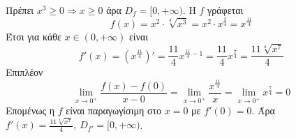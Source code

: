\begin{alist}
\item Πρέπει $ x^3\geq 0\Rightarrow x\geq 0 $ άρα $ D_f=[0,+\infty) $. Η $ f $ γράφεται
\[ f(x)=x^2\cdot\sqrt[4]{x^3}=x^2\cdot x^{\frac{3}{4}}=x^{\frac{11}{4}} \]
Έτσι για κάθε $ x\in(0,+\infty) $ είναι
\[ f'(x)=\left(x^{\frac{11}{4}}\right)'=\frac{11}{4}x^{\frac{11}{4}-1}=\frac{11}{4}x^{\frac{7}{4}}=\frac{11\sqrt[4]{x^7}}{4} \]
Επιπλέον
\[ \lim_{x\to 0^+}{\frac{f(x)-f(0)}{x-0}}=\lim_{x\to 0^+}\frac{x^{\frac{11}{4}}}{x}=\lim_{x\to 0^+}{x^{\frac{7}{4}}}=0 \]
Επομένως η $ f $ είναι παραγωγίσιμη στο $ x=0 $ με $ f'(0)=0 $. Άρα $ f'(x)=\frac{11\sqrt[4]{x^7}}{4} ,\ D_{f'}=[0,+\infty) $.
\end{alist}
